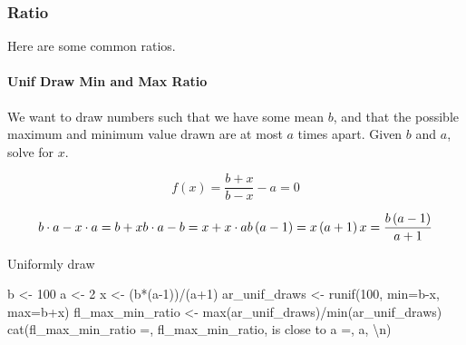 \documentclass[
]{book}
\newenvironment{Shaded}{\begin{snugshade}}{\end{snugshade}}
\newcommand{\AttributeTok}[1]{\textcolor[rgb]{0.77,0.63,0.00}{#1}}
\newcommand{\DecValTok}[1]{\textcolor[rgb]{0.00,0.00,0.81}{#1}}
\newcommand{\FunctionTok}[1]{\textcolor[rgb]{0.00,0.00,0.00}{#1}}
\newcommand{\NormalTok}[1]{#1}
\newcommand{\OtherTok}[1]{\textcolor[rgb]{0.56,0.35,0.01}{#1}}
\newcommand{\SpecialCharTok}[1]{\textcolor[rgb]{0.00,0.00,0.00}{#1}}
\newcommand{\StringTok}[1]{\textcolor[rgb]{0.31,0.60,0.02}{#1}}
\begin{document}
\hypertarget{ratio}{%
\subsubsection{Ratio}\label{ratio}}

Here are some common ratios.

\hypertarget{unif-draw-min-and-max-ratio}{%
\paragraph{Unif Draw Min and Max Ratio}\label{unif-draw-min-and-max-ratio}}

We want to draw numbers such that we have some mean \(b\), and that the possible maximum and minimum value drawn are at most \(a\) times apart. Given \(b\) and \(a\), solve for \(x\).

\[
f(x) = \frac{b+x}{b-x} - a = 0
\]

\[
b \cdot a - x \cdot a = b + x \\
b \cdot a - b = x + x \cdot a  \\
b \left(a - 1\right) = x \left( a+ 1\right)  \\
x = \frac{b\left(a-1\right)}{a+1}\\
\]

Uniformly draw

\begin{Shaded}
\begin{Highlighting}[]
\NormalTok{b }\OtherTok{\textless{}{-}} \DecValTok{100}
\NormalTok{a }\OtherTok{\textless{}{-}} \DecValTok{2}
\NormalTok{x }\OtherTok{\textless{}{-}}\NormalTok{ (b}\SpecialCharTok{*}\NormalTok{(a}\DecValTok{{-}1}\NormalTok{))}\SpecialCharTok{/}\NormalTok{(a}\SpecialCharTok{+}\DecValTok{1}\NormalTok{)}
\NormalTok{ar\_unif\_draws }\OtherTok{\textless{}{-}} \FunctionTok{runif}\NormalTok{(}\DecValTok{100}\NormalTok{, }\AttributeTok{min=}\NormalTok{b}\SpecialCharTok{{-}}\NormalTok{x, }\AttributeTok{max=}\NormalTok{b}\SpecialCharTok{+}\NormalTok{x)}
\NormalTok{fl\_max\_min\_ratio }\OtherTok{\textless{}{-}} \FunctionTok{max}\NormalTok{(ar\_unif\_draws)}\SpecialCharTok{/}\FunctionTok{min}\NormalTok{(ar\_unif\_draws)}
\FunctionTok{cat}\NormalTok{(}\StringTok{\textquotesingle{}fl\_max\_min\_ratio =\textquotesingle{}}\NormalTok{, fl\_max\_min\_ratio, }\StringTok{\textquotesingle{}is close to a =\textquotesingle{}}\NormalTok{, a, }\StringTok{\textquotesingle{}}\SpecialCharTok{\textbackslash{}n}\StringTok{\textquotesingle{}}\NormalTok{)}
\end{Highlighting}
\end{Shaded}
\end{document}
